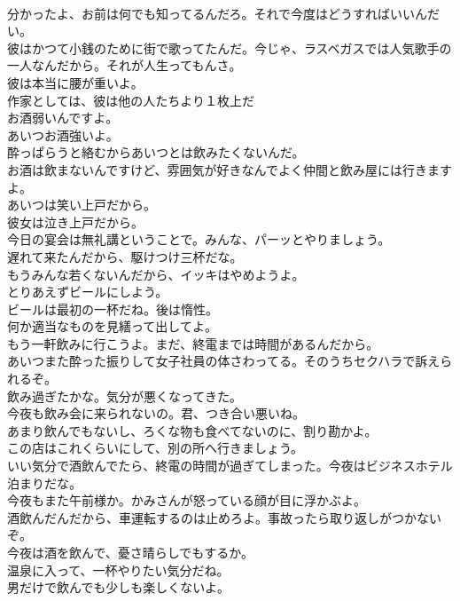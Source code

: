 \documentclass[8pt]{extreport}
\begin{document}
\begin{CJK}{UTF8}{min}
\\	分かったよ、お前は何でも知ってるんだろ。それで今度はどうすればいいんだい。	
\\	彼はかつて小銭のために街で歌ってたんだ。今じゃ、ラスベガスでは人気歌手の一人なんだから。それが人生ってもんさ。	
\\	彼は本当に腰が重いよ。	
\\	作家としては、彼は他の人たちより１枚上だ	
\\	お酒弱いんですよ。	
\\	あいつお酒強いよ。	
\\	酔っぱらうと絡むからあいつとは飲みたくないんだ。	
\\	お酒は飲まないんですけど、雰囲気が好きなんでよく仲間と飲み屋には行きますよ。	
\\	あいつは笑い上戸だから。	
\\	彼女は泣き上戸だから。	
\\	今日の宴会は無礼講ということで。みんな、パーッとやりましょう。	
\\	遅れて来たんだから、駆けつけ三杯だな。	
\\	もうみんな若くないんだから、イッキはやめようよ。	
\\	とりあえずビールにしよう。	
\\	ビールは最初の一杯だね。後は惰性。	
\\	何か適当なものを見繕って出してよ。	
\\	もう一軒飲みに行こうよ。まだ、終電までは時間があるんだから。	
\\	あいつまた酔った振りして女子社員の体さわってる。そのうちセクハラで訴えられるぞ。	
\\	飲み過ぎたかな。気分が悪くなってきた。	
\\	今夜も飲み会に来られないの。君、つき合い悪いね。	
\\	あまり飲んでもないし、ろくな物も食べてないのに、割り勘かよ。	
\\	この店はこれくらいにして、別の所へ行きましょう。	
\\	いい気分で酒飲んでたら、終電の時間が過ぎてしまった。今夜はビジネスホテル泊まりだな。	
\\	今夜もまた午前様か。かみさんが怒っている顔が目に浮かぶよ。	
\\	酒飲んだんだから、車運転するのは止めろよ。事故ったら取り返しがつかないぞ。	
\\	今夜は酒を飲んで、憂さ晴らしでもするか。	
\\	温泉に入って、一杯やりたい気分だね。	
\\	男だけで飲んでも少しも楽しくないよ。	

\end{CJK}
\end{document}
